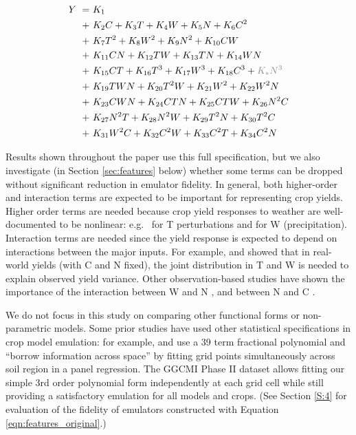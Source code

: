 \documentclass[gmd, manuscript]{copernicus} %
\begin{document}
\vspace{-0.2in}
\begin{align}
    \label{eqn:features_original}
    Y\ = \ & K_{1}  \\
    + \ & K_{2} C    + K_{3} T     + K_{4} W   + K_{5} N  + K_{6} C^2 \nonumber \\
    + \ & K_{7} T^2  + K_{8} W^2   + K_{9} N^2 + K_{10} C W \nonumber \\
    + \ & K_{11} C N + K_{12} T W  + K_{13} T N + K_{14} W N \nonumber \\
    + \ & K_{15} C T + K_{16} T^3  + K_{17} W^3  + K_{18} C^3 + {\color{dark-gray}K_{*} N^3} \nonumber \\
    + \ & K_{19} T W N + K_{20} T^2 W + K_{21} W^2 + K_{22} W^2 N  \nonumber \\
    + \ & K_{23} C W N + K_{24} C T N + K_{25} C T W + K_{26} N^2 C \nonumber \\
    + \ & K_{27} N^2 T + K_{28} N^2 W + K_{29} T^2 N + K_{30} T^2 C  \nonumber \\
    + \ & K_{31} W^2 C + K_{32} C^2 W + K_{33} C^2 T + K_{34} C^2 N \nonumber
\end{align}

Results shown throughout the paper use this full specification, but we also investigate (in Section \ref{sec:features} below) whether some terms can be dropped without significant reduction in emulator fidelity.
In general, both higher-order and interaction terms are expected to be important for representing crop yields. Higher order terms are needed because crop yield responses to weather are well-documented to be nonlinear: e.g.\ \citet{Schlenker2009} for T perturbations and \citet{He2016} for W (precipitation). 
Interaction terms are needed since the yield response is expected to depend on interactions between the major inputs. 
For example, \citet{Lobell2007} and \citet{Tebaldi2008} showed that in real-world yields (with C and N fixed), the joint distribution in T and W is needed to explain observed yield variance.  
Other observation-based studies have shown the importance of the interaction between W and N \citep[e.g.][]{AULAKH2005}, and between N and C \citep{Mitsuru92, Nakamura97}.

We do not focus in this study on comparing other functional forms or non-parametric models.
Some prior studies have used other statistical specifications in crop model emulation: for example, \citet{BLANC2015} and \citet{BLANC2017} use a 39 term fractional polynomial 
and ``borrow information across space'' by fitting grid points simultaneously across soil region in a panel regression. 
The GGCMI Phase II dataset allows fitting our simple 3rd order polynomial form independently at each grid cell while still providing a satisfactory emulation for all models and crops. 
(See Section \ref{S:4} for evaluation of the fidelity of emulators constructed with Equation \ref{eqn:features_original}.)
\end{document}
